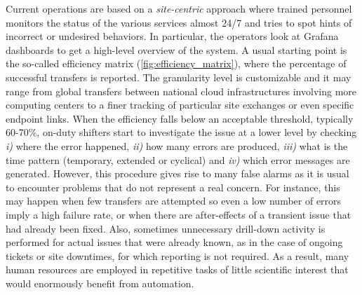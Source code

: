 Current operations are based on a \textit{site-centric} approach where trained personnel monitors the status of the various services almost 24/7 and tries to spot hints of incorrect or undesired behaviors. In particular, the operators look at Grafana dashboards to get a high-level overview of the system. A usual starting point is the so-called efficiency matrix (\cref{fig:efficiency_matrix}), where the percentage of successful transfers is reported. The granularity level is customizable and it may range from global transfers between national cloud infrastructures involving more computing centers to a finer tracking of particular site exchanges or even specific endpoint links. 
When the efficiency falls below an acceptable threshold, typically 60-70\%, on-duty shifters start to investigate the issue at a lower level by checking \emph{i)} where the error happened, \emph{ii)} how many errors are produced, \emph{iii)} what is the time pattern (temporary, extended or cyclical) and \emph{iv)} which error messages are generated. 
However, this procedure gives rise to many false alarms as it is usual to encounter problems that do not represent a real concern. For instance, this may happen when few transfers are attempted so even a low number of errors imply a high failure rate, or when there are after-effects of a transient issue that had already been fixed. 
Also, sometimes unnecessary drill-down activity is performed for actual issues that were already known, as in the case of ongoing tickets or site downtimes, for which reporting is not required.
As a result, many human resources are employed in repetitive tasks of little scientific interest that would enormously benefit from automation. 

